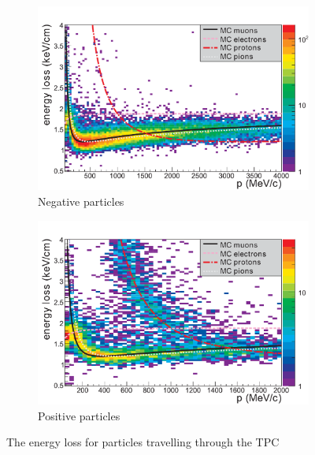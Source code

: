 \begin{figure}[!h]
	\begin{subfigure}[t]{0.49\textwidth}
		\includegraphics[width=\textwidth]{figures/numu/TPC_PID_neg}
		\caption{Negative particles}
	\end{subfigure}
	\begin{subfigure}[t]{0.49\textwidth}
		\includegraphics[width=\textwidth]{figures/numu/TPC_PID_pos}
		\caption{Positive particles}
	\end{subfigure}
	\caption{The energy loss for particles travelling through the TPC}
	\label{fig:TPC_dedx}
\end{figure}

